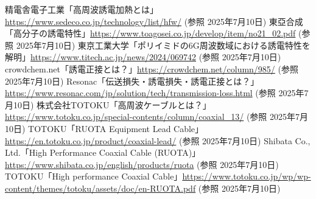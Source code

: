 \documentclass[11pt,a4paper]{ltjsarticle} %
\begin{document}
\begin{thebibliography}{99}
 精電舎電子工業「高周波誘電加熱とは」\url{https://www.sedeco.co.jp/technology/list/hfw/} (参照 2025年7月10日)
 東亞合成「高分子の誘電特性」\url{https://www.toagosei.co.jp/develop/item/no21_02.pdf} (参照 2025年7月10日)
 東京工業大学「ポリイミドの6G周波数域における誘電特性を解明」\url{https://www.titech.ac.jp/news/2024/069742} (参照 2025年7月10日)
 crowdchem.net「誘電正接とは？」\url{https://crowdchem.net/column/985/} (参照 2025年7月10日)
 Resonac「伝送損失・誘電損失・誘電正接とは？」\url{https://www.resonac.com/jp/solution/tech/transmission-loss.html} (参照 2025年7月10日)
 株式会社TOTOKU「高周波ケーブルとは？」\url{https://www.totoku.co.jp/special-contents/column/coaxial_13/} (参照 2025年7月10日)
 TOTOKU「RUOTA Equipment Lead Cable」\url{https://en.totoku.co.jp/product/coaxial-lead/} (参照 2025年7月10日)
 Shibata Co., Ltd.「High Performance Coaxial Cable (RUOTA)」\url{https://www.shibata.co.jp/english/products/ruota} (参照 2025年7月10日)
 TOTOKU「High performance Coaxial Cable」\url{https://www.totoku.co.jp/wp/wp-content/themes/totoku/assets/doc/en-RUOTA.pdf} (参照 2025年7月10日)
\end{thebibliography}
\end{document}
